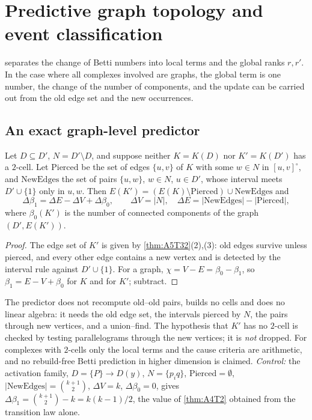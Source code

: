 \section{Predictive graph topology and event classification}\label{sec:prediction}
 separates the change of Betti numbers into local terms and the global ranks $r,r'$. In the case where all complexes involved are graphs, the global term is one number, the change of the number of components, and the update can be carried out from the old edge set and the new occurrences.

\subsection{An exact graph-level predictor}
\begin{theorem}\label{thm:A5T44}
Let $D\subseteq D'$, $N=D'\setminus D$, and suppose neither $K=K(D)$ nor $K'=K(D')$ has a $2$-cell. Let $\mathrm{Pierced}$ be the set of edges $\{u,v\}$ of $K$ with some $w\in N$ in $[u,v]^\circ$, and $\mathrm{NewEdges}$ the set of pairs $\{u,w\}$, $w\in N$, $u\in D'$, whose interval meets $D'\cup\{1\}$ only in $u,w$. Then $E(K')=(E(K)\setminus\mathrm{Pierced})\cup\mathrm{NewEdges}$ and
\[
\Delta\beta_1=\Delta E-\Delta V+\Delta\beta_0,\qquad\Delta V=|N|,\quad\Delta E=|\mathrm{NewEdges}|-|\mathrm{Pierced}|,
\]
where $\beta_0(K')$ is the number of connected components of the graph $(D',E(K'))$.
\end{theorem}
\begin{proof}
The edge set of $K'$ is given by \cref{thm:A5T32}(2),(3): old edges survive unless pierced, and every other edge contains a new vertex and is detected by the interval rule against $D'\cup\{1\}$. For a graph, $\chi=V-E=\beta_0-\beta_1$, so $\beta_1=E-V+\beta_0$ for $K$ and for $K'$; subtract. \qedhere
\end{proof}
\begin{remark}
The predictor does not recompute old--old pairs, builds no cells and does no linear algebra: it needs the old edge set, the intervals pierced by $N$, the pairs through new vertices, and a union--find. The hypothesis that $K'$ has no $2$-cell is checked by testing parallelograms through the new vertices; it is \emph{not} dropped. For complexes with $2$-cells only the local terms and the cause criteria are arithmetic, and no rebuild-free Betti prediction in higher dimension is claimed. \emph{Control:} the activation family, $D=\{P\}\to D(y)$, $N=\{p_iq\}$, $\mathrm{Pierced}=\emptyset$, $|\mathrm{NewEdges}|=\binom{k+1}{2}$, $\Delta V=k$, $\Delta\beta_0=0$, gives $\Delta\beta_1=\binom{k+1}2-k=k(k-1)/2$, the value of \cref{thm:A4T2} obtained from the transition law alone.
\end{remark}
